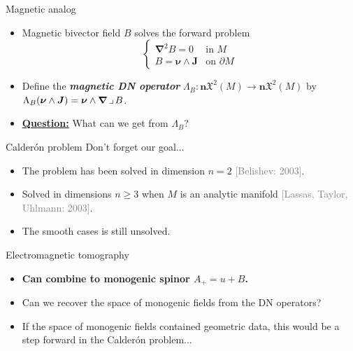 \documentclass[aspectratio=169]{beamer}
\newcommand\boldgreen[1]{\textcolor{lighter_csu_green}{\emph{\textbf{#1}}}}
\newcommand\boldgold[1]{\textcolor{csu_gold}{\textbf{#1}}}
\newcommand\grey[1]{\textcolor{gray}{#1}}
\newcommand{\normalpart}{\boldsymbol{n}}
\newcommand{\grad}{\boldsymbol{\nabla}}
\newcommand{\blade}[1]{\boldsymbol{#1}}
\newcommand{\normal}{\blade{\nu}}
\newcommand{\contract}{\hspace*{.5mm} \lrcorner \hspace*{.5mm}}
\newcommand{\smoothfields}{\mathfrak{X}}
\begin{document}
\begin{frame}{Magnetic analog}
\vfill
\begin{itemize}
\pause
\item Magnetic bivector field $B$ solves the forward problem
\[
\begin{cases}
\grad^2 B = 0 & \textrm{in $M$}\\
B = \normal \wedge \blade{J} & \textrm{on $\partial M$}
\end{cases}
\]
\pause
\item Define the \boldgreen{magnetic DN operator} $\Lambda_B \colon \normalpart \smoothfields^2(M) \to \normalpart \smoothfields^2(M)$ by $\Lambda_B(\normal \wedge \blade{J}) = \normal \wedge \grad \contract B$.
\pause
\item \textbf{\underline{Question:}} What can we get from $\Lambda_B$?
\end{itemize}
\vfill
\end{frame}
\begin{frame}{Calder\'on problem}
\vfill
Don't forget our goal...
\begin{itemize}
\pause
    \item The problem has been solved in dimension $n=2$ \grey{[Belishev: 2003]}.
\pause
    \item Solved in dimensions $n\geq 3$ when $M$ is an analytic manifold \grey{[Lassas, Taylor, Uhlmann: 2003]}.
\pause
\item The smooth cases is still unsolved.
\end{itemize}
\vfill
\end{frame}

\begin{frame}{Electromagnetic tomography}
\vfill
\begin{itemize}
\pause
\item \boldgold{Can combine to monogenic spinor $A_+=u+B$.}
\pause
\item Can we recover the space of monogenic fields from the DN operators?
\pause
\item If the space of monogenic fields contained geometric data, this would be a step forward in the Calder\'on problem...
\end{itemize}
\vfill
\end{frame}
\end{document}
